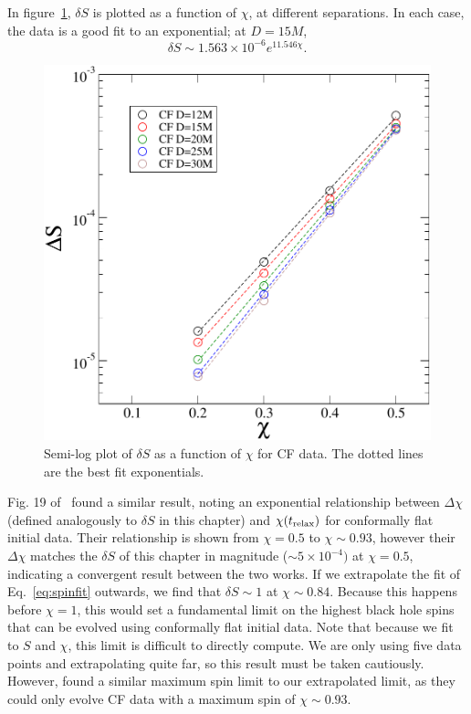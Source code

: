In figure~\ref{fig:SvsS}, $\delta S$ is plotted as a function
of $\chi$, at different separations. In each case, the data is a good
fit to an exponential; at $D=15M$,
\begin{equation}
\label{eq:spinfit}
\delta S \sim 1.563\times10^{-6}e^{11.546\chi}.
\end{equation}
\begin{figure}[!htbp]
\includegraphics[scale=0.95]{chap5/SvsS2}
\caption[Semi-log plot of $\delta S$ as a function of $\chi$ for CF data.]{Semi-log plot of $\delta S$ as a function of $\chi$ for CF data. The
  dotted lines are the best fit exponentials.}
\label{fig:SvsS}
\end{figure}
Fig. 19 of~\cite{Lovelace2008} found a similar result, noting an exponential relationship between $\Delta \chi$ (defined analogously to $\delta S$ in this chapter) and $\chi(t_{\rm relax})$ for conformally flat initial data. Their relationship is shown from $\chi=0.5$ to $\chi\sim0.93$, however their $\Delta\chi$ matches the $\delta S$ of this chapter in magnitude ($\sim 5\times 10^{-4})$ at $\chi=0.5$, indicating a convergent result between the two works.
If we extrapolate the fit of Eq.~\ref{eq:spinfit} outwards, we find that $\delta S\sim 1$ at
$\chi\sim0.84$. Because this happens before $\chi=1$, this would set a fundamental limit on the highest black
hole spins that can be evolved using conformally flat initial
data. Note that because we fit to $S$ and $\chi$, this limit is
difficult to directly compute. We are only using five data points and extrapolating quite far, so this result must be taken cautiously. However, \cite{Lovelace2008} found a similar maximum spin limit to our extrapolated limit, as they could only evolve CF data
with a maximum spin of $\chi\sim0.93$.



